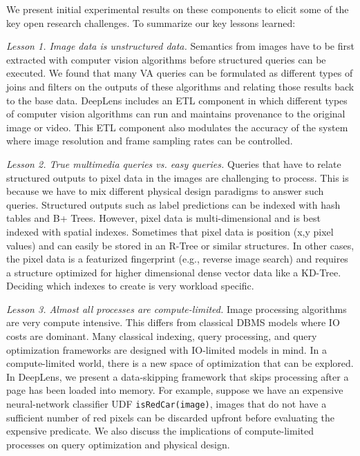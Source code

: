 We present initial experimental results on these components to elicit some of the key open research challenges. To summarize our key lessons learned:

\vspace{0.5em}

\noindent \emph{Lesson 1. Image data is unstructured data. } Semantics from images have to be first extracted with computer vision algorithms before structured queries can be executed. We found that many VA queries can be formulated as different types of joins and filters on the outputs of these algorithms and relating those results back to the base data. \textsf{DeepLens} includes an ETL component in which different types of computer vision algorithms can run and maintains provenance to the original image or video. This ETL component also modulates the accuracy of the system where image resolution and frame sampling rates can be controlled.      

\vspace{0.5em}

\noindent \emph{Lesson 2. True multimedia queries vs. easy queries. }
Queries that have to relate structured outputs to pixel data in the images are challenging to process. This is because we have to mix different physical design paradigms to answer such queries. Structured outputs such as label predictions can be indexed with hash tables and B+ Trees. However, pixel data is multi-dimensional and is best indexed with spatial indexes. Sometimes that pixel data is position (x,y pixel values) and can easily be stored in an R-Tree or similar structures. In other cases, the pixel data is a featurized fingerprint (e.g., reverse image search) and requires a structure optimized for higher dimensional dense vector data like a KD-Tree. Deciding which indexes to create is very workload specific.


\vspace{0.5em}

\noindent \emph{Lesson 3. Almost all processes are compute-limited. }
Image processing algorithms are very compute intensive. This differs from classical DBMS models where IO costs are dominant. 
Many classical indexing, query processing, and query optimization frameworks are designed with IO-limited models in mind.
In a compute-limited world, there is a new space of optimization that can be explored.
In \textsf{DeepLens}, we present a data-skipping framework that skips processing after a page has been loaded into memory. For example, suppose we have an expensive neural-network classifier UDF \texttt{isRedCar(image)}, images that do not have a sufficient number of red pixels can be discarded upfront before evaluating the expensive predicate. We also discuss the implications of compute-limited processes on query optimization and physical design.









